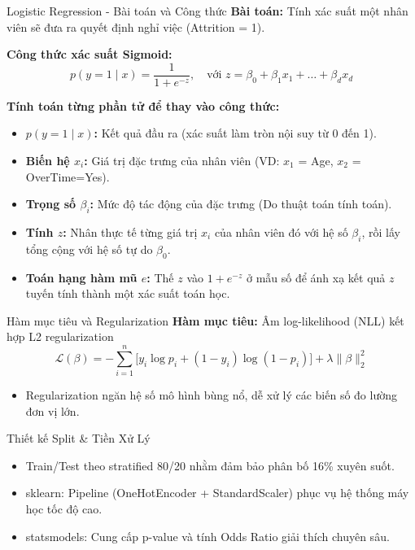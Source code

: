 \begin{frame}{Logistic Regression - Bài toán và Công thức}
  \textbf{Bài toán:} Tính xác suất một nhân viên sẽ đưa ra quyết định nghỉ việc (Attrition = 1).
  
  \vspace{0.2cm}
  \textbf{Công thức xác suất Sigmoid:}
  \[
  p(y=1\mid x) = \frac{1}{1+e^{-z}}, \quad \text{với } z = \beta_0 + \beta_1 x_1 + \dots + \beta_d x_d
  \]
  
  \textbf{Tính toán từng phần tử để thay vào công thức:}
  \begin{itemize}
    \item \textbf{$p(y=1\mid x)$:} Kết quả đầu ra (xác suất làm tròn nội suy từ 0 đến 1).
    \item \textbf{Biến hệ $x_i$:} Giá trị đặc trưng của nhân viên (VD: $x_1$ = Age, $x_2$ = OverTime=Yes).
    \item \textbf{Trọng số $\beta_i$:} Mức độ tác động của đặc trưng (Do thuật toán tính toán).
    \item \textbf{Tính $z$:} Nhân thực tế từng giá trị $x_i$ của nhân viên đó với hệ số $\beta_i$, rồi lấy tổng cộng với hệ số tự do $\beta_0$.
    \item \textbf{Toán hạng hàm mũ $e$:} Thế $z$ vào $1+e^{-z}$ ở mẫu số để ánh xạ kết quả $z$ tuyến tính thành một xác suất toán học.
  \end{itemize}
\end{frame}

\begin{frame}{Hàm mục tiêu và Regularization}
  \textbf{Hàm mục tiêu:} Âm log-likelihood (NLL) kết hợp L2 regularization 
  \[
  \mathcal{L}(\beta) = -\sum_{i=1}^{n}\Big[y_i\log p_i + (1-y_i)\log(1-p_i)\Big] + \lambda \|\beta\|_2^2
  \]
  
  \vspace{0.4cm}
  \begin{itemize}
    \item Regularization ngăn hệ số mô hình bùng nổ, dễ xử lý các biến số đo lường đơn vị lớn.
  \end{itemize}
  
  \vspace{0.3cm}
  \begin{alertblock}{Thiết kế Split \& Tiền Xử Lý}
    \begin{itemize}
      \item Train/Test theo stratified 80/20 nhằm đảm bảo phân bố 16\% xuyên suốt.
      \item sklearn: Pipeline (OneHotEncoder + StandardScaler) phục vụ hệ thống máy học tốc độ cao.
      \item statsmodels: Cung cấp p-value và tính Odds Ratio giải thích chuyên sâu.
    \end{itemize}
  \end{alertblock}
\end{frame}
